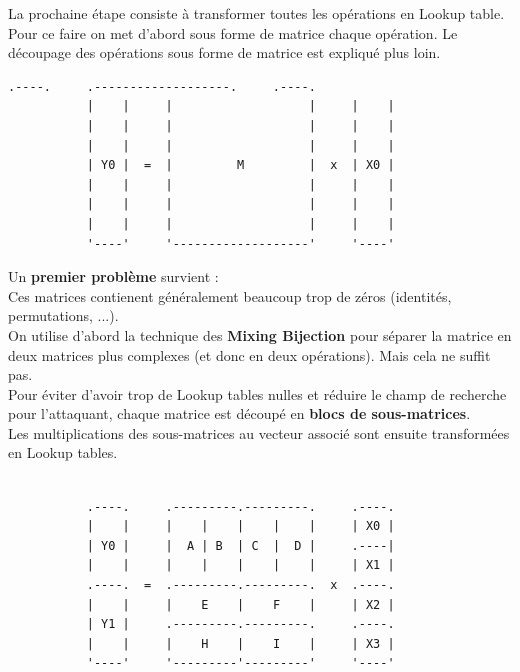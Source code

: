 \documentclass[a4paper,12pt]{article}
\begin{document}
La prochaine étape consiste à transformer toutes les opérations en Lookup table. Pour ce faire on met d'abord sous forme de matrice chaque opération. Le découpage des opérations sous forme de matrice est expliqué plus loin.\\


\begin{Verbatim}[samepage=true]
           .----.     .-------------------.     .----.
           |    |     |                   |     |    |
           |    |     |                   |     |    |
           |    |     |                   |     |    |
           | Y0 |  =  |         M         |  x  | X0 |
           |    |     |                   |     |    |
           |    |     |                   |     |    |
           |    |     |                   |     |    |
           '----'     '-------------------'     '----'

\end{Verbatim}

Un \textbf{premier problème} survient :\\

Ces matrices contienent généralement beaucoup trop de zéros (identités, permutations, ...).\\
On utilise d'abord la technique des \textbf{Mixing Bijection} pour séparer la matrice en deux matrices plus complexes (et donc en deux opérations). Mais cela ne suffit pas.\\
Pour éviter d'avoir trop de Lookup tables nulles et réduire le champ de recherche pour l'attaquant, chaque matrice est découpé en \textbf{blocs de sous-matrices}.\\
Les multiplications des sous-matrices au vecteur associé sont ensuite transformées en Lookup tables.\\

\begin{Verbatim}[samepage=true]

           .----.     .---------.---------.     .----.
           |    |     |    |    |    |    |     | X0 |
           | Y0 |     |  A | B  | C  |  D |     .----|
           |    |     |    |    |    |    |     | X1 |
           .----.  =  .---------.---------.  x  .----.
           |    |     |    E    |    F    |     | X2 |
           | Y1 |     .---------.---------.     .----.
           |    |     |    H    |    I    |     | X3 |
           '----'     '---------'---------'     '----'
           
\end{Verbatim}
\end{document}

